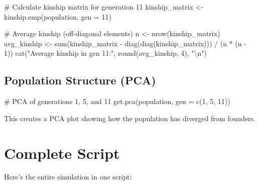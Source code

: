 \documentclass[
  letterpaper,
]{book}
\newenvironment{Shaded}{\begin{snugshade}}{\end{snugshade}}
\newcommand{\AttributeTok}[1]{\textcolor[rgb]{0.40,0.45,0.13}{#1}}
\newcommand{\CommentTok}[1]{\textcolor[rgb]{0.37,0.37,0.37}{#1}}
\newcommand{\DecValTok}[1]{\textcolor[rgb]{0.68,0.00,0.00}{#1}}
\newcommand{\FunctionTok}[1]{\textcolor[rgb]{0.28,0.35,0.67}{#1}}
\newcommand{\NormalTok}[1]{\textcolor[rgb]{0.00,0.23,0.31}{#1}}
\newcommand{\OtherTok}[1]{\textcolor[rgb]{0.00,0.23,0.31}{#1}}
\newcommand{\SpecialCharTok}[1]{\textcolor[rgb]{0.37,0.37,0.37}{#1}}
\newcommand{\StringTok}[1]{\textcolor[rgb]{0.13,0.47,0.30}{#1}}
\begin{document}
\begin{Shaded}
\begin{Highlighting}[]
\CommentTok{\# Calculate kinship matrix for generation 11}
\NormalTok{kinship\_matrix }\OtherTok{\textless{}{-}} \FunctionTok{kinship.emp}\NormalTok{(population, }\AttributeTok{gen =} \DecValTok{11}\NormalTok{)}

\CommentTok{\# Average kinship (off{-}diagonal elements)}
\NormalTok{n }\OtherTok{\textless{}{-}} \FunctionTok{nrow}\NormalTok{(kinship\_matrix)}
\NormalTok{avg\_kinship }\OtherTok{\textless{}{-}} \FunctionTok{sum}\NormalTok{(kinship\_matrix }\SpecialCharTok{{-}} \FunctionTok{diag}\NormalTok{(}\FunctionTok{diag}\NormalTok{(kinship\_matrix))) }\SpecialCharTok{/}\NormalTok{ (n }\SpecialCharTok{*}\NormalTok{ (n }\SpecialCharTok{{-}} \DecValTok{1}\NormalTok{))}
\FunctionTok{cat}\NormalTok{(}\StringTok{"Average kinship in gen 11:"}\NormalTok{, }\FunctionTok{round}\NormalTok{(avg\_kinship, }\DecValTok{4}\NormalTok{), }\StringTok{"}\SpecialCharTok{\textbackslash{}n}\StringTok{"}\NormalTok{)}
\end{Highlighting}
\end{Shaded}

\subsection{Population Structure (PCA)}\label{population-structure-pca}

\begin{Shaded}
\begin{Highlighting}[]
\CommentTok{\# PCA of generations 1, 5, and 11}
\FunctionTok{get.pca}\NormalTok{(population, }\AttributeTok{gen =} \FunctionTok{c}\NormalTok{(}\DecValTok{1}\NormalTok{, }\DecValTok{5}\NormalTok{, }\DecValTok{11}\NormalTok{))}
\end{Highlighting}
\end{Shaded}

This creates a PCA plot showing how the population has diverged from
founders.

\section{Complete Script}\label{complete-script}

Here's the entire simulation in one script:
\end{document}
